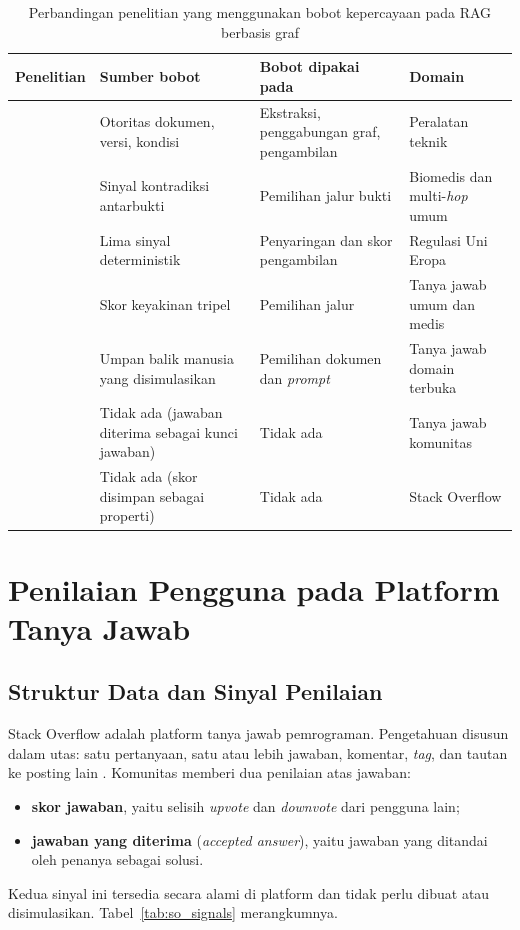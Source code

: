 \begin{table}[!htbp]
\centering
\caption{Perbandingan penelitian yang menggunakan bobot kepercayaan pada RAG berbasis graf}
\label{tab:penelitian-bobot}
\footnotesize
\begin{tabular}{|p{2.5cm}|p{3.4cm}|p{3.5cm}|p{3.3cm}|}
\hline
\textbf{Penelitian} & \textbf{Sumber bobot} & \textbf{Bobot dipakai pada} & \textbf{Domain} \\
\hline
\textcite{Shi2026} &
Otoritas dokumen, versi, kondisi &
Ekstraksi, penggabungan graf, pengambilan &
Peralatan teknik \\
\hline
\textcite{Asghari2026} &
Sinyal kontradiksi antarbukti &
Pemilihan jalur bukti &
Biomedis dan multi-\emph{hop} umum \\
\hline
\textcite{TAMRplus2026} &
Lima sinyal deterministik &
Penyaringan dan skor pengambilan &
Regulasi Uni Eropa \\
\hline
\textcite{Yu2026DoG} &
Skor keyakinan tripel &
Pemilihan jalur &
Tanya jawab umum dan medis \\
\hline
\textcite{LiTrustProp2026} &
Umpan balik manusia yang disimulasikan &
Pemilihan dokumen dan \emph{prompt} &
Tanya jawab domain terbuka \\
\hline
\textcite{Banerjee2024} &
Tidak ada (jawaban diterima sebagai kunci jawaban) &
Tidak ada &
Tanya jawab komunitas \\
\hline
\textcite{Kleybolte2026} &
Tidak ada (skor disimpan sebagai properti) &
Tidak ada &
Stack Overflow \\
\hline
\end{tabular}
\end{table}

\section{Penilaian Pengguna pada Platform Tanya Jawab}
\label{sec:penilaian-pengguna}

\subsection{Struktur Data dan Sinyal Penilaian}

Stack Overflow adalah platform tanya jawab pemrograman. Pengetahuan disusun dalam utas: satu pertanyaan, satu atau lebih jawaban, komentar, \emph{tag}, dan tautan ke posting lain \autocite{Kleybolte2026}. Komunitas memberi dua penilaian atas jawaban:
\begin{itemize}
  \item \textbf{skor jawaban}, yaitu selisih \emph{upvote} dan \emph{downvote}
dari pengguna lain;
  \item \textbf{jawaban yang diterima} (\emph{accepted answer}), yaitu jawaban
yang ditandai oleh penanya sebagai solusi.
\end{itemize}
Kedua sinyal ini tersedia secara alami di platform dan tidak perlu dibuat atau disimulasikan. Tabel~\ref{tab:so_signals} merangkumnya.

